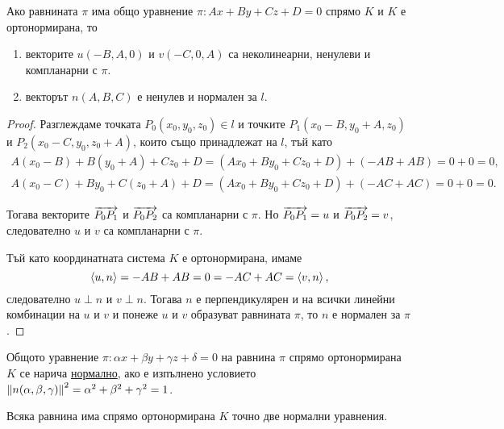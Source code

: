 \documentclass[numbers=endperiod, DIV=15]{scrartcl}
\begin{document}
\begin{proposition}
  Ако равнината $\pi$ има общо уравнение $\pi: Ax + By + Cz + D = 0$ спрямо $K$ и $K$ е ортонормирана, то
  \begin{enumerate}
    \item векторите $u(-B, A, 0)$ и $v(-C, 0, A)$ са неколинеарни, ненулеви и компланарни с $\pi$.
    \item векторът $n(A, B, C)$ е ненулев и нормален за $l$.
  \end{enumerate}
\end{proposition}
\begin{proof}
  \item Разглеждаме точката $P_0(x_0, y_0, z_0) \in l$ и точките $P_1(x_0 - B, y_0 + A, z_0)$ и $P_2(x_0 - C, y_0, z_0 + A)$, които също принадлежат на $l$, тъй като
  \begin{align*}
    A(x_0 - B) + B(y_0 + A) + Cz_0 + D = (Ax_0 + By_0 + Cz_0 + D) + (-AB + AB) = 0 + 0 = 0, \\
    A(x_0 - C) + By_0 + C(z_0 + A) + D = (Ax_0 + By_0 + Cz_0 + D) + (-AC + AC) = 0 + 0 = 0.
  \end{align*}

  Тогава векторите $\overrightarrow{P_0 P_1}$ и $\overrightarrow{P_0 P_2}$ са компланарни с $\pi$. Но $\overrightarrow{P_0 P_1} = u$ и $\overrightarrow{P_0 P_2} = v$, следователно $u$ и $v$ са компланарни с $\pi$.

  \item Тъй като координатната система $K$ е ортонормирана, имаме
  \begin{displaymath}
    \left\langle u, n \right\rangle = -AB + AB = 0 = -AC + AC = \left\langle v, n \right\rangle,
  \end{displaymath}
  следователно $u \perp n$ и $v \perp n$. Тогава $n$ е перпендикулярен и на всички линейни комбинации на $u$ и $v$ и понеже $u$ и $v$ образуват равнината $\pi$, то $n$ е нормален за $\pi$.
\end{proof}

\begin{definition}
  Общото уравнение $\pi: \alpha x + \beta y + \gamma z + \delta = 0$ на равнина $\pi$ спрямо ортонормирана $K$ се нарича \underline{нормално}, ако е изпълнено условието $\left\Vert n(\alpha, \beta, \gamma) \right\Vert^2 = \alpha^2 + \beta^2 + \gamma^2 = 1$.
\end{definition}

\begin{proposition}
  Всяка равнина има спрямо ортонормирана $K$ точно две нормални уравнения.
\end{proposition}
\end{document}
